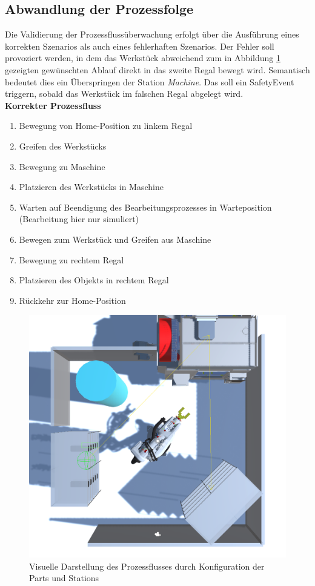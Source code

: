 \subsection{Abwandlung der Prozessfolge}

Die Validierung der Prozessflussüberwachung erfolgt über die Ausführung eines
korrekten Szenarios als auch eines fehlerhaften Szenarios. Der Fehler soll
provoziert werden, in dem das Werkstück abweichend zum in Abbildung
\ref{figure:Prozessfluss} gezeigten gewünschten Ablauf direkt in das zweite
Regal bewegt wird. Semantisch bedeutet dies ein Überspringen der Station
\textit{Machine}. Das soll ein SafetyEvent triggern, sobald das Werkstück im
falschen Regal abgelegt wird.\\

\noindent
\textbf{Korrekter Prozessfluss}
\begin{enumerate}
  \item Bewegung von Home-Position zu linkem Regal
  \item Greifen des Werkstücks
  \item Bewegung zu Maschine
  \item Platzieren des Werkstücks in Maschine
  \item Warten auf Beendigung des Bearbeitungsprozesses in
    Warteposition (Bearbeitung hier nur simuliert)
  \item Bewegen zum Werkstück und Greifen aus Maschine
  \item Bewegung zu rechtem Regal
  \item Platzieren des Objekts in rechtem Regal
  \item Rückkehr zur Home-Position
\end{enumerate}
\begin{figure}[H]
  \centering
  \includegraphics[width=0.7\linewidth]{Figures/Prozessfolge.png}
  \caption{Visuelle Darstellung des Prozessflusses durch Konfiguration der Parts
  und Stations}
  \label{figure:Prozessfluss}
\end{figure}

